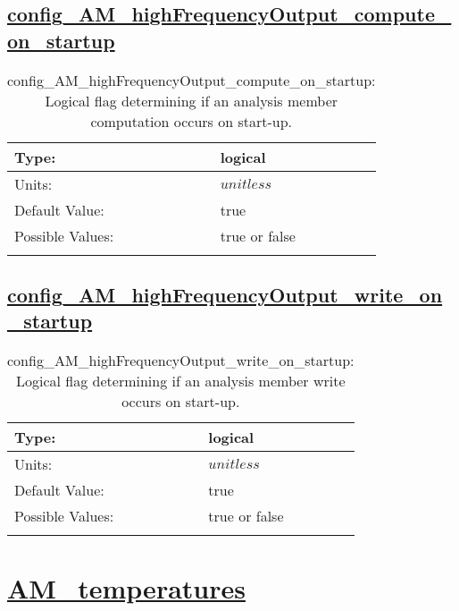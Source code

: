 \subsection[config\_AM\_highFrequencyOutput\_compute\_on\_startup]{\hyperref[sec:nm_tab_AM_highFrequencyOutput]{config\_AM\_highFrequencyOutput\_compute\_on\_startup}}
\label{subsec:nm_sec_config_AM_highFrequencyOutput_compute_on_startup}
\begin{center}
\begin{longtable}{| p{2.0in} || p{4.0in} |}
    \hline
    Type: & logical \\
    \hline
    Units: & $unitless$ \\
    \hline
    Default Value: & true \\
    \hline
    Possible Values: & true or false \\
    \hline
    \caption{config\_AM\_highFrequencyOutput\_compute\_on\_startup: Logical flag determining if an analysis member computation occurs on start-up.}
\end{longtable}
\end{center}
\subsection[config\_AM\_highFrequencyOutput\_write\_on\_startup]{\hyperref[sec:nm_tab_AM_highFrequencyOutput]{config\_AM\_highFrequencyOutput\_write\_on\_startup}}
\label{subsec:nm_sec_config_AM_highFrequencyOutput_write_on_startup}
\begin{center}
\begin{longtable}{| p{2.0in} || p{4.0in} |}
    \hline
    Type: & logical \\
    \hline
    Units: & $unitless$ \\
    \hline
    Default Value: & true \\
    \hline
    Possible Values: & true or false \\
    \hline
    \caption{config\_AM\_highFrequencyOutput\_write\_on\_startup: Logical flag determining if an analysis member write occurs on start-up.}
\end{longtable}
\end{center}
\section[AM\_temperatures]{\hyperref[sec:nm_tab_AM_temperatures]{AM\_temperatures}}
\label{sec:nm_sec_AM_temperatures}
